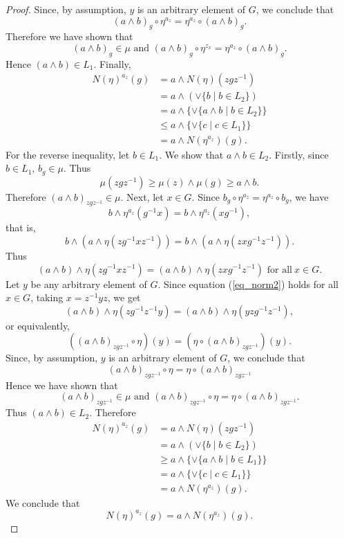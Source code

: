 \documentclass[10pt]{article}
\theoremstyle{plain}
\theoremstyle{definition}
\theoremstyle{remark}
\theoremstyle{case}
\begin{document}
\begin{proof}
	Since, by assumption, $y$ is an arbitrary element of $G$, we conclude that 
	\[ (a \wedge b)_g \circ \eta^{a_z} = \eta^{a_z} \circ (a \wedge b)_g. \]
	Therefore we have shown that 
	\[ (a \wedge b)_g \in \mu \text{ and } (a \wedge b)_g \circ \eta^{z_x} = \eta^{a_z} \circ (a \wedge b)_g. \]
	Hence $(a \wedge b) \in L_1$. Finally,
	\begin{equation*}
	\begin{split}
		N(\eta)^{a_z}(g) &= a \wedge N(\eta)(zgz^{-1}) \\
			&= a \wedge (\vee \{ b \mid b \in L_2 \}) \\
			&= a \wedge \{\vee \{ a \wedge b \mid b \in L_2 \}\} \\
			&\leq a \wedge \{\vee \{ c \mid c \in L_1\}\} \\
			&= a \wedge N(\eta^{a_z})(g).
	\end{split}
	\end{equation*}
	For the reverse inequality, let $b \in L_1$. We show that $a \wedge b \in L_2$. Firstly, since $b \in L_1$, $b_g \in \mu$. Thus
	\[ \mu(zgz^{-1}) \geq \mu(z) \wedge \mu(g) \geq a \wedge b. \]
	Therefore $(a \wedge b)_{zgz^{-1}} \in \mu$. Next, let $x \in G$. Since $b_g \circ \eta^{a_z} = \eta^{a_z} \circ b_g$, we have 
	\[ b \wedge \eta^{a_z}(g^{-1}x) = b \wedge \eta^{a_z}(xg^{-1}), \]
	that is, 
	\[ b \wedge (a \wedge \eta(zg^{-1}xz^{-1})) = b \wedge (a \wedge \eta(zxg^{-1}z^{-1})). \]
	Thus 
	\begin{equation}\label{eq_norm2}
		(a \wedge b) \wedge \eta(zg^{-1}xz^{-1}) = (a \wedge b) \wedge \eta(zxg^{-1}z^{-1}) \text{~for all}~x \in G.
	\end{equation}
	Let $y$ be any arbitrary element of $G$. Since equation (\ref{eq_norm2}) holds for all $x \in G$, taking $x = z^{-1}yz$, we get
	\[ (a \wedge b) \wedge \eta(zg^{-1}z^{-1}y) = (a \wedge b) \wedge \eta(yzg^{-1}z^{-1}), \]
	or equivalently,
	\[((a \wedge b)_{zgz^{-1}} \circ \eta)(y) = (\eta \circ (a \wedge b)_{zgz^{-1}})(y). \]
	Since, by assumption, $y$ is an arbitrary element of $G$, we conclude that 
	\[ (a \wedge b)_{zgz^{-1}} \circ \eta = \eta \circ (a \wedge b)_{zgz^{-1}} \]
	Hence we have shown that 
	\[ (a \wedge b)_{zgz^{-1}} \in \mu \text{ and } (a \wedge b)_{zgz^{-1}} \circ \eta = \eta \circ (a \wedge b)_{zgz^{-1}}. \]
	Thus $(a \wedge b) \in L_2$. Therefore
	\begin{equation*}
	\begin{split}
		N(\eta)^{a_z}(g) &= a \wedge N(\eta)(zgz^{-1}) \\
		&= a \wedge (\vee \{ b \mid b \in L_2 \}) \\
		&\geq a \wedge \{\vee \{ a \wedge b \mid b \in L_1 \}\} \\
		&= a \wedge \{\vee \{ c \mid c \in L_1\}\} \\
		&= a \wedge N(\eta^{a_z})(g).
	\end{split}
	\end{equation*}
    We conclude that 
    \[ N(\eta)^{a_z}(g) = a \wedge N(\eta^{a_z})(g). \]
\end{proof}
\end{document}
